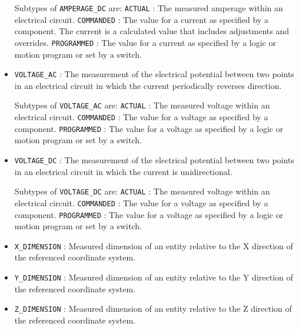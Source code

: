 \begin{itemize}
Subtypes of \texttt{AMPERAGE_DC} are: 
\newline\tab \texttt{ACTUAL} : The measured amperage within an electrical circuit. 
\newline\tab \texttt{COMMANDED} : The value for a current as specified by a component. 
The  current is a calculated value that includes adjustments and overrides. 
\newline\tab \texttt{PROGRAMMED} : The value for a current as specified by a logic or motion program or set by a switch. 
\item \texttt{VOLTAGE_AC} : The measurement of the electrical potential between two points in an electrical circuit in which the current periodically reverses direction. 

Subtypes of \texttt{VOLTAGE_AC} are: 
\newline\tab \texttt{ACTUAL} : The measured voltage within an electrical circuit. 
\newline\tab \texttt{COMMANDED} : The value for a voltage as specified by a  component. 
\newline\tab \texttt{PROGRAMMED} : The value for a voltage as specified by a logic or motion program or set by a switch. 
\item \texttt{VOLTAGE_DC} : The measurement of the electrical potential between two points in an electrical circuit in which the current is unidirectional. 

Subtypes of \texttt{VOLTAGE_DC} are: 
\newline\tab \texttt{ACTUAL} : The measured voltage within an electrical circuit. 
\newline\tab \texttt{COMMANDED} : The value for a voltage as specified by a  component. 
\newline\tab \texttt{PROGRAMMED} : The value for a voltage as specified by a logic or motion program or set by a switch. 
\item \texttt{X_DIMENSION} : Measured dimension of an entity relative to the X direction of the referenced coordinate system.
 

\item \texttt{Y_DIMENSION} : Measured dimension of an entity relative to the Y direction of the referenced coordinate system. 

\item \texttt{Z_DIMENSION} : Measured dimension of an entity relative to the Z direction of the referenced coordinate system. 


\end{itemize}
